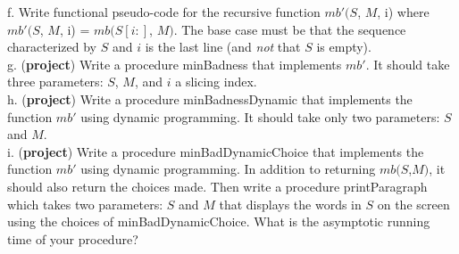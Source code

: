 \documentclass{report}
\def\light#1{{\color{light}#1}}
\begin{document}
{    f. Write functional pseudo-code for the recursive function \(mb'(S\), \(M\), i) where \(mb'(S\), \(M\), i) = \(mb(S[i:]\), \(M)\). 
    The base case must be that the sequence characterized by \(S\) and \(i\) is the last line (and \textit{not} that \(S\) is empty).\\
    g. (\textbf{project}) Write a procedure \light{minBadness} that implements \(mb'\). 
    It should take three parameters: \(S\), \(M\), and \(i\) a slicing index.\\
    h. (\textbf{project}) Write a procedure \light{minBadnessDynamic} that implements the function \(mb'\) using dynamic programming.
    It should take only two parameters: \(S\) and \(M\).\\
    i. (\textbf{project}) Write a procedure \light{minBadDynamicChoice} that implements the function \(mb'\) using dynamic programming.
    In addition to returning \(mb(S\),\(M)\), it should also return the choices made. Then write a procedure \light{printParagraph} 
    which takes two parameters: \(S\) and \(M\) that displays the words in \(S\) on the screen using the choices of \light{minBadDynamicChoice}.
    What is the asymptotic running time of your procedure?\\
}




\end{document}

